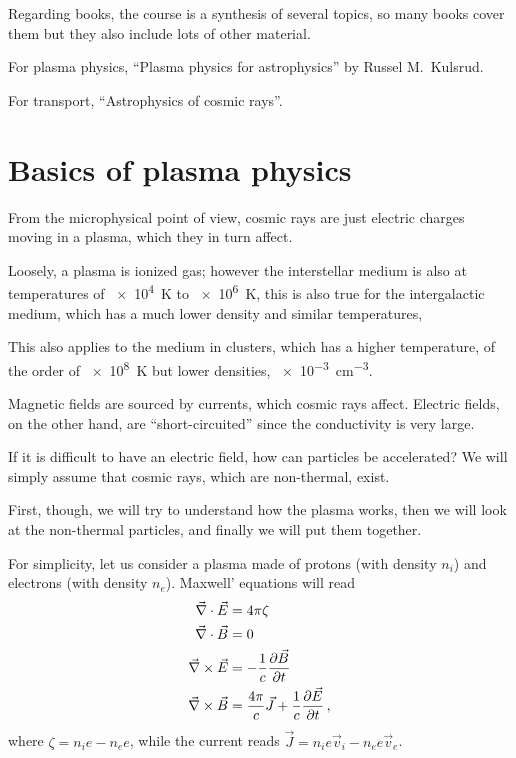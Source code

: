 \documentclass[main.tex]{subfiles}
\begin{document}

Regarding books, the course is a synthesis of several topics, so many books cover them but they also include lots of other material.

For plasma physics, ``Plasma physics for astrophysics'' by Russel M.\ Kulsrud.

For transport, ``Astrophysics of cosmic rays''.

\section{Basics of plasma physics}

From the microphysical point of view, cosmic rays are just electric charges moving in a plasma, which they in turn  affect. 

Loosely, a plasma is ionized gas; however the interstellar medium is also at temperatures of \SI{e4}{K} to \SI{e6}{K}, this is also true for the intergalactic medium, which has a much lower density and similar temperatures, 

This also applies to the medium in clusters, which has a higher temperature, of the order of \SI{e8}{K} but lower densities, \SI{e-3}{cm^{-3}}.

Magnetic fields are sourced by currents, which cosmic rays affect. 
Electric fields, on the other hand, are ``short-circuited'' since the conductivity is very large. 

If it is difficult to have an electric field, how can particles be accelerated? 
We will simply assume that cosmic rays, which are non-thermal, exist. 

First, though, we will try to understand how the plasma works, then we will look at the non-thermal particles, and finally we will put them together.

For simplicity, let us consider a plasma made of protons (with density \(n_i\)) and electrons (with density \(n_e\)). 
Maxwell' equations will read 
%
\begin{subequations}\label{eq:maxwell}
\begin{align}
\vec{\nabla} \cdot \vec{E} &= 4 \pi \zeta  \\
\vec{\nabla} \cdot \vec{B} &= 0  \\
\vec{\nabla} \times \vec{E} &= - \frac{1}{c} \pdv{\vec{B}}{t}  \\
\vec{\nabla} \times \vec{B} &= \frac{4 \pi }{c} \vec{J} + \frac{1}{c} \pdv{\vec{E}}{t}
\,,
\end{align}
\end{subequations}
%
where \(\zeta = n_i e - n_e e\), while the current reads \(\vec{J} = n_i e \vec{v}_i - n_e e \vec{v}_e\). 
\end{document}
